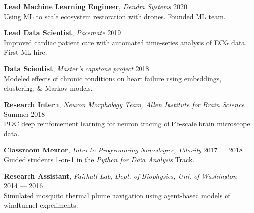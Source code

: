 \documentclass[a4paper,12pt]{article}
\newcommand{\resheading}[1]{{\vspace*{.001in} \colorbox{mygrey}{\begin{minipage}{\textwidth}{\textmd{\large \textbf{#1} \vphantom{p\^{E}}}}\end{minipage}}} }
\newcommand{\ressubheading}[4]{
        \textbf{#1} \hfill #2\\
        \textit{#3} \hfill #4 \\}
\begin{document}
{\setlength{\parskip}{8pt}

\textbf{Lead Machine Learning Engineer}, \textit{Dendra Systems} \hfill 2020 \\
Using ML to scale ecosystem restoration with drones. Founded ML team.


\textbf{Lead Data Scientist}, \textit{Pacemate} \hfill 2019 \\
Improved cardiac patient care with automated time-series analysis of ECG data. First ML hire.

\textbf{Data Scientist}, \textit{Master's capstone project} \hfill 2018\\
Modeled effects of chronic conditions on heart failure using embeddings, clustering, \& Markov models.

\textbf{Research Intern}, \textit{Neuron Morphology Team, Allen Institute for Brain Science} \hfill Summer 2018\\
POC deep reinforcement learning for neuron tracing of Pb-scale brain microscope data.


\textbf{Classroom Mentor}, \textit{Intro to Programming Nanodegree, Udacity} \hfill 2017 --- 2018\\
Guided students 1-on-1 in the \textit{Python for Data Analysis} Track.

\textbf{Research Assistant}, \textit{Fairhall Lab, Dept. of Biophysics, Uni. of Washington} \hfill 2014 --- 2016\\
Simulated mosquito thermal plume navigation using agent-based models of windtunnel experiments.\\


}
%
%
\end{document}
